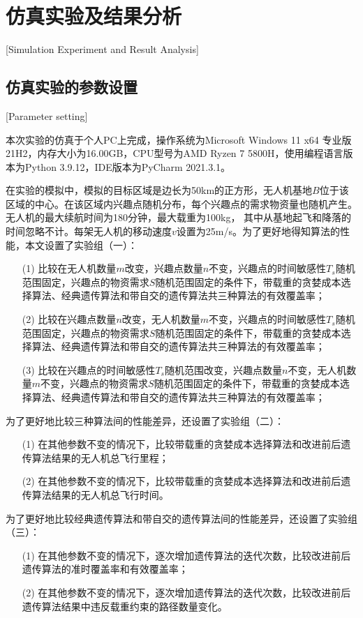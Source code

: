 
\chapter{仿真实验及结果分析}[Simulation Experiment and Result Analysis]

\section{仿真实验的参数设置}[Parameter setting]

本次实验的仿真于个人PC上完成，操作系统为Microsoft Windows 11 x64 专业版 21H2，内存大小为16.00GB，CPU型号为AMD Ryzen 7 5800H，使用编程语言版本为Python 3.9.12，IDE版本为PyCharm 2021.3.1。


在实验的模拟中，模拟的目标区域是边长为50km的正方形，无人机基地$B$位于该区域的中心。在该区域内兴趣点随机分布，每个兴趣点的需求物资量也随机产生。无人机的最大续航时间为180分钟，最大载重为100kg，
其中从基地起飞和降落的时间忽略不计。每架无人机的移动速度$v$设置为25m/s。为了更好地得知算法的性能，本文设置了实验组（一）：
\begin{itemize}
	\item [(1)] 比较在无人机数量$m$改变，兴趣点数量$n$不变，兴趣点的时间敏感性$T_s$随机范围固定，兴趣点的物资需求$S$随机范围固定的条件下，带载重的贪婪成本选择算法、经典遗传算法和带自交的遗传算法共三种算法的有效覆盖率；
    \item [(2)] 比较在兴趣点数量$n$改变，无人机数量$m$不变，兴趣点的时间敏感性$T_s$随机范围固定，兴趣点的物资需求$S$随机范围固定的条件下，带载重的贪婪成本选择算法、经典遗传算法和带自交的遗传算法共三种算法的有效覆盖率；
    \item [(3)] 比较在兴趣点的时间敏感性$T_s$随机范围改变，兴趣点数量$n$不变，无人机数量$m$不变，兴趣点的物资需求$S$随机范围固定的条件下，带载重的贪婪成本选择算法、经典遗传算法和带自交的遗传算法共三种算法的有效覆盖率；
\end{itemize}


为了更好地比较三种算法间的性能差异，还设置了实验组（二）：
\begin{itemize}
	\item [(1)] 在其他参数不变的情况下，比较带载重的贪婪成本选择算法和改进前后遗传算法结果的无人机总飞行里程；
    \item [(2)] 在其他参数不变的情况下，比较带载重的贪婪成本选择算法和改进前后遗传算法结果的无人机总飞行时间。
\end{itemize}


为了更好地比较经典遗传算法和带自交的遗传算法间的性能差异，还设置了实验组（三）：
\begin{itemize}
	\item [(1)] 在其他参数不变的情况下，逐次增加遗传算法的迭代次数，比较改进前后遗传算法的准时覆盖率和有效覆盖率；
 	\item [(2)] 在其他参数不变的情况下，逐次增加遗传算法的迭代次数，比较改进前后遗传算法结果中违反载重约束的路径数量变化。
\end{itemize}
